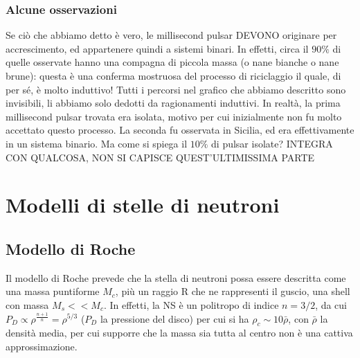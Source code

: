 \subsubsection{Alcune osservazioni}
Se ciò che abbiamo detto è vero, le millisecond pulsar DEVONO originare per accrescimento, ed appartenere quindi a sistemi binari.
In effetti, circa il $90\%$ di quelle osservate hanno una compagna di piccola massa (o nane bianche o nane brune): questa è una conferma mostruosa del processo di riciclaggio il quale, di per sé, è molto induttivo!
Tutti i percorsi nel grafico che abbiamo descritto sono invisibili, li abbiamo solo dedotti da ragionamenti induttivi.
In realtà, la prima millisecond pulsar trovata era isolata, motivo per cui inizialmente non fu molto accettato questo processo.
La seconda fu osservata in Sicilia, ed era effettivamente in un sistema binario. Ma come si spiega il $10\%$ di pulsar isolate? INTEGRA CON QUALCOSA, NON SI CAPISCE QUEST'ULTIMISSIMA PARTE

\section{Modelli di stelle di neutroni}

\subsection{Modello di Roche}
Il modello di Roche prevede che la stella di neutroni possa essere descritta come una massa puntiforme $M_c$, più un raggio R che ne rappresenti il guscio, una shell con massa $M_s<<M_c$.
In effetti, la NS è un politropo di indice $n=3/2$,  da cui $P_D\propto \rho^{\frac{n+1}{n}} = \rho^{5/3} $ ($P_D$ la pressione del disco) per cui si ha $\rho_c \sim 10\bar{\rho}$, con $\bar{\rho}$ la densità media, per cui supporre che la massa sia tutta al centro non è una cattiva approssimazione.
